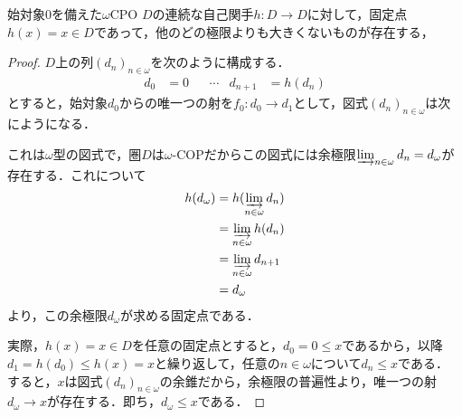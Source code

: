 \documentclass[uplatex, 12pt, dvipdfmx]{jsarticle}
\begin{document}
\begin{proposition}
    始対象$0$を備えた$\omega$CPO $D$の連続な自己関手$h:D\to D$に対して，固定点$h(x)=x\in D$であって，他のどの極限よりも大きくないものが存在する，
\end{proposition}
\begin{proof}
    $D$上の列$(d_n)_{n\in\omega}$を次のように構成する．
    \begin{align*}
        d_0 &= 0 & &\cdots& d_{n+1}&= h(d_n)
    \end{align*}
    とすると，始対象$d_0$からの唯一つの射を$f_0:d_0\to d_1$として，図式$(d_n)_{n\in\omega}$は次にようになる．
    \begin{center}
    \end{center}
    これは$\omega$型の図式で，圏$D$は$\omega$-COPだからこの図式には余極限$\varinjlim_{n\in\omega}d_n=d_\omega$が存在する．これについて
    \begin{align*}
        h(d_\omega) &= h(\varinjlim_{n\in\omega}d_n) \\
        &= \varinjlim_{n\in\omega}h(d_n) \\
        &= \varinjlim_{n\in\omega}d_{n+1} \\
        &=d_\omega
    \end{align*}
    より，この余極限$d_\omega$が求める固定点である．

    実際，$h(x)=x\in D$を任意の固定点とすると，$d_0=0\le x$であるから，以降$d_1=h(d_0)\le h(x)=x$と繰り返して，任意の$n\in\omega$について$d_n\le x$である．
    すると，$x$は図式$(d_n)_{n\in\omega}$の余錐だから，余極限の普遍性より，唯一つの射$d_\omega\to x$が存在する．即ち，$d_\omega\le x$である．
\end{proof}

\vspace{3cm}
\end{document}
